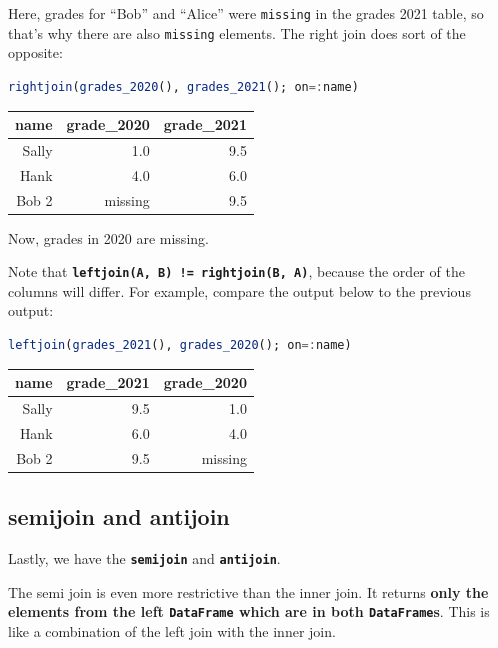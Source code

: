\documentclass[
  notoc %
]{tufte-book}
\newcommand{\passthrough}[1]{#1}
\begin{document}
Here, grades for ``Bob'' and ``Alice'' were
\passthrough{\lstinline!missing!} in the grades 2021 table, so that's
why there are also \passthrough{\lstinline!missing!} elements. The right
join does sort of the opposite:

\begin{lstlisting}[language=Julia]
rightjoin(grades_2020(), grades_2021(); on=:name)
\end{lstlisting}

\begin{longtable}[]{@{}rrr@{}}
\toprule
name & grade\_2020 & grade\_2021 \\
\midrule
\endhead
Sally & 1.0 & 9.5 \\
Hank & 4.0 & 6.0 \\
Bob 2 & missing & 9.5 \\
\bottomrule
\end{longtable}

Now, grades in 2020 are missing.

Note that
\textbf{\passthrough{\lstinline"leftjoin(A, B) != rightjoin(B, A)"}},
because the order of the columns will differ. For example, compare the
output below to the previous output:

\begin{lstlisting}[language=Julia]
leftjoin(grades_2021(), grades_2020(); on=:name)
\end{lstlisting}

\begin{longtable}[]{@{}rrr@{}}
\toprule
name & grade\_2021 & grade\_2020 \\
\midrule
\endhead
Sally & 9.5 & 1.0 \\
Hank & 6.0 & 4.0 \\
Bob 2 & 9.5 & missing \\
\bottomrule
\end{longtable}

\hypertarget{sec:semijoin_antijoin}{%
\subsection{semijoin and antijoin}\label{sec:semijoin_antijoin}}

Lastly, we have the \textbf{\passthrough{\lstinline!semijoin!}} and
\textbf{\passthrough{\lstinline!antijoin!}}.

The semi join is even more restrictive than the inner join. It returns
\textbf{only the elements from the left
\passthrough{\lstinline!DataFrame!} which are in both
\passthrough{\lstinline!DataFrame!}s}. This is like a combination of the
left join with the inner join.
\end{document}
